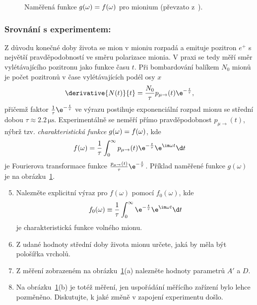 	\begin{figure}[!htbp]
		\centering
		\caption{
			Naměřená funkce $g(\omega)=\real f(\omega)$ pro mionium (převzato z~\cite{Basdevant2000}).
		}
		\label{fig:mionium}
	\end{figure}		

	\subsubsection*{Srovnání s experimentem:}
	Z důvodu konečné doby života se mion v mioniu rozpadá a emituje pozitron $e^{+}$ s největší pravděpodobností ve směru polarizace mionia.
	V praxi se tedy měří směr vylétávajícího pozitronu jako funkce času $t$.
	Při bombardování balíkem $N_{0}$ mionů je počet pozitronů v čase vylétávajících podél osy $x$ 
	\begin{equation}
		\derivative{N(t)}{t}=\frac{N_{0}}{\tau}p_{\mu\rightarrow}(t)\e^{-\frac{t}{\tau}},
	\end{equation}
	přičemž faktor $\frac{1}{\tau}\e^{-\frac{t}{\tau}}$ ve výrazu postihuje exponenciální rozpad mionu se střední dobou $\tau\approx2.2\,\mathrm{\mu s}$.
	Experimentálně se neměří přímo pravděpodobnost $p_{\mu\rightarrow}(t)$, nýbrž tzv. \emph{charakteristická funkce} $g(\omega)=\real f(\omega)$, kde
	\begin{equation}
		f(\omega)=\frac{1}{\tau}\int_{0}^{\infty}p_{\mu\rightarrow}(t)\e^{-\frac{t}{\tau}}\e^{\im\omega t}\d t
	\end{equation}
	je Fourierova transformace funkce $\frac{p_{\mu\rightarrow}(t)}{\tau}\e^{-\frac{t}{\tau}}$.
	Příklad naměřené funkce $g(\omega)$ je na obrázku~\ref{fig:mionium}.
			
	\begin{enumerate}
	\setcounter{enumi}{4}
	\item 
		Nalezněte explicitní výraz pro $f(\omega)$ pomocí $f_{0}(\omega)$,
		kde
		\begin{equation}
			f_{0}(\omega)
				\equiv\frac{1}{\tau}\int_{0}^{\infty}\e^{-\frac{t}{\tau}}\e^{\im\omega t}\d t
		\end{equation}	
		je charakteristická funkce volného mionu.
	
	\item
		Z udané hodnoty střední doby života mionu určete, jaká by měla být pološířka vrcholů.
	
	\item
		Z měření zobrazeném na obrázku~\ref{fig:mionium}(a) nalezněte hodnoty parametrů $A'$ a $D$.

	\item
		Na obrázku~\ref{fig:mionium}(b) je totéž měření, jen uspořádání měřícího zařízení bylo lehce pozměněno.
		Diskutujte, k jaké změně v zapojení experimentu došlo.					
	\end{enumerate}

